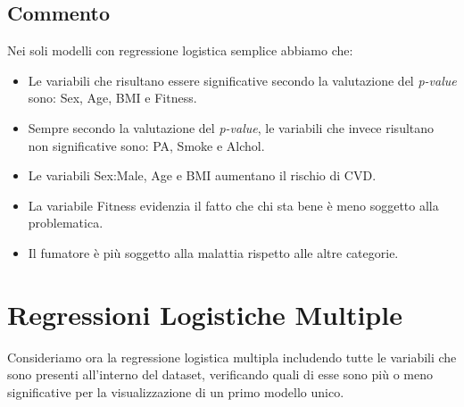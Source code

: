\documentclass{article}\usepackage[]{graphicx}\usepackage[]{xcolor}
\begin{document}
  \subsection{Commento}
    Nei soli modelli con regressione logistica semplice abbiamo che:
    \begin{itemize}
      \item Le variabili che risultano essere significative secondo la valutazione
            del \emph{p-value} sono: Sex, Age, BMI e Fitness.
      \item Sempre secondo la valutazione del \emph{p-value}, le variabili che 
            invece risultano non significative sono: PA, Smoke e Alchol.
      \item Le variabili Sex:Male, Age e BMI aumentano il rischio di CVD.
      \item La variabile Fitness evidenzia il fatto che chi sta bene è meno
            soggetto alla problematica.
      \item Il fumatore è più soggetto alla malattia rispetto alle altre categorie.
    \end{itemize}
  
\clearpage


\section{Regressioni Logistiche Multiple}
  Consideriamo ora la regressione logistica multipla includendo tutte le variabili
  che sono presenti all'interno del dataset, verificando quali di esse sono più 
  o meno significative per la visualizzazione di un primo modello unico.
  
\end{document}
